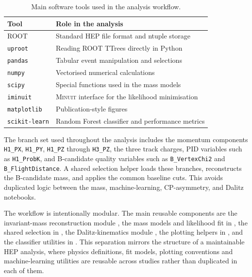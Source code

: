 \begin{table}[H]
  \centering
  \caption{Main software tools used in the analysis workflow.}
  \label{tab:software}
  \begin{tabular}{ll}
    \toprule
    Tool & Role in the analysis \\
    \midrule
    ROOT & Standard HEP file format and ntuple storage \\
    \texttt{uproot} & Reading ROOT TTrees directly in Python \\
    \texttt{pandas} & Tabular event manipulation and selections \\
    \texttt{numpy} & Vectorised numerical calculations \\
    \texttt{scipy} & Special functions used in the mass models \\
    \texttt{iminuit} & \textsc{Minuit} interface for the likelihood minimisation \\
    \texttt{matplotlib} & Publication-style figures \\
    \texttt{scikit-learn} & Random Forest classifier and performance metrics \\
    \bottomrule
  \end{tabular}
\end{table}

The branch set used throughout the analysis includes the momentum components \texttt{H1\_PX}, \texttt{H1\_PY}, \texttt{H1\_PZ} through \texttt{H3\_PZ}, the three track charges, PID variables such as \texttt{H1\_ProbK}, and B-candidate quality variables such as \texttt{B\_VertexChi2} and \texttt{B\_FlightDistance}. A shared selection helper loads these branches, reconstructs the B-candidate mass, and applies the common baseline cuts. This avoids duplicated logic between the mass, machine-learning, CP-asymmetry, and Dalitz notebooks.

The workflow is intentionally modular. The main reusable components are the invariant-mass reconstruction module , the mass models and likelihood fit in , the shared selection in , the Dalitz-kinematics module , the plotting helpers in , and the classifier utilities in . This separation mirrors the structure of a maintainable HEP analysis, where physics definitions, fit models, plotting conventions and machine-learning utilities are reusable across studies rather than duplicated in each of them.
